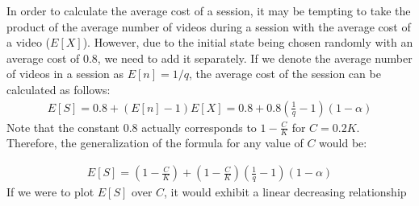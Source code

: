 \documentclass[12pt]{article}
\begin{document}
          In order to calculate the average cost of a session, it may be tempting to take the product of the average number of 
          videos during a session with the average cost of a video ($E[X]$). However, due to the initial state being chosen
           randomly with an average cost of 0.8, we need to add it separately. If we denote the average number of videos in
            a session as $E[n] = 1/q$, the average cost of the session can be calculated as follows:
           \begin{align*}
               E[S] = 0.8 + (E[n]-1)E[X] = 0.8 + 0.8(\frac{1}{q}-1)(1-\alpha)  
           \end{align*}
           Note that the constant 0.8 actually corresponds to $1-\frac{C}{K}$ for $C=0.2K$. Therefore, the generalization of the formula for any value of $C$ would be:

\begin{align*}
E[S] = \left(1-\frac{C}{K}\right) + \left(1-\frac{C}{K}\right)(\frac{1}{q}-1)(1-\alpha)
\end{align*}
If we were to plot $E[S]$ over $C$, it would exhibit a linear decreasing relationship
        
\end{document}
